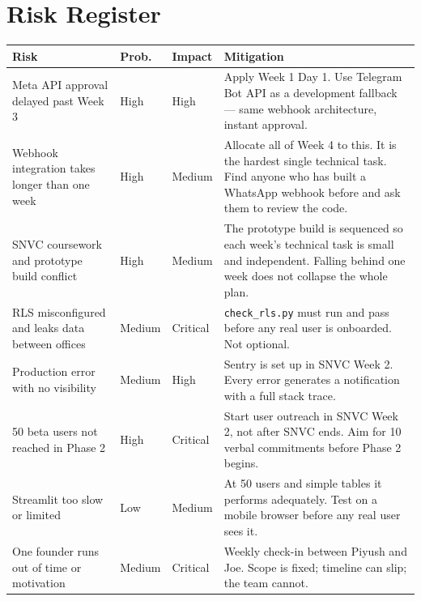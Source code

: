 \documentclass[12pt, a4paper]{article}
\begin{document}
\newpage

\section{Risk Register}

\renewcommand{\arraystretch}{1.5}
\begin{tabularx}{\textwidth}{X p{1.4cm} p{1.4cm} X}
\toprule
\rowcolor{pollitylightblue}
\textbf{Risk} & \textbf{Prob.} & \textbf{Impact} & \textbf{Mitigation} \\
\midrule
Meta API approval delayed past Week 3 & High & High & Apply Week 1 Day 1. Use Telegram Bot API as a development fallback --- same webhook architecture, instant approval. \\
Webhook integration takes longer than one week & High & Medium & Allocate all of Week 4 to this. It is the hardest single technical task. Find anyone who has built a WhatsApp webhook before and ask them to review the code. \\
SNVC coursework and prototype build conflict & High & Medium & The prototype build is sequenced so each week's technical task is small and independent. Falling behind one week does not collapse the whole plan. \\
RLS misconfigured and leaks data between offices & Medium & Critical & \texttt{check\_rls.py} must run and pass before any real user is onboarded. Not optional. \\
Production error with no visibility & Medium & High & Sentry is set up in SNVC Week 2. Every error generates a notification with a full stack trace. \\
50 beta users not reached in Phase 2 & High & Critical & Start user outreach in SNVC Week 2, not after SNVC ends. Aim for 10 verbal commitments before Phase 2 begins. \\
Streamlit too slow or limited & Low & Medium & At 50 users and simple tables it performs adequately. Test on a mobile browser before any real user sees it. \\
One founder runs out of time or motivation & Medium & Critical & Weekly check-in between Piyush and Joe. Scope is fixed; timeline can slip; the team cannot. \\
\bottomrule
\end{tabularx}

\newpage
\end{document}
